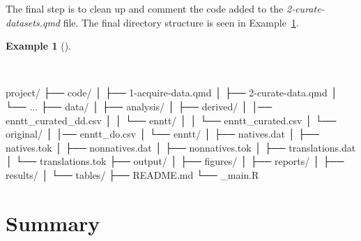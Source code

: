 \documentclass[
  letterpaper,
  DIV=11,
  numbers=noendperiod]{scrreport}
\newenvironment{Shaded}{\begin{snugshade}}{\end{snugshade}}
\newcommand{\ExtensionTok}[1]{\textcolor[rgb]{0.00,0.00,0.00}{#1}}
\newcommand{\NormalTok}[1]{\textcolor[rgb]{0.00,0.00,0.00}{#1}}
\theoremstyle{definition}
\newtheorem{example}{Example}[chapter]
\theoremstyle{remark}
\begin{document}
The final step is to clean up and comment the code added to the
\emph{2-curate-datasets.qmd} file. The final directory structure is seen
in Example~\ref{exm-cd-enntt-final-directory-structure}.

\begin{example}[]\protect\hypertarget{exm-cd-enntt-final-directory-structure}{}\label{exm-cd-enntt-final-directory-structure}

~

\begin{Shaded}
\begin{Highlighting}[]
\ExtensionTok{project/}
\ExtensionTok{├──}\NormalTok{ code/}
\ExtensionTok{│}\NormalTok{   ├── 1{-}acquire{-}data.qmd}
\ExtensionTok{│}\NormalTok{   ├── 2{-}curate{-}data.qmd}
\ExtensionTok{│}\NormalTok{   └── ...}
\ExtensionTok{├──}\NormalTok{ data/}
\ExtensionTok{│}\NormalTok{   ├── analysis/}
\ExtensionTok{│}\NormalTok{   ├── derived/}
\ExtensionTok{│}\NormalTok{       │── enntt\_curated\_dd.csv}
\ExtensionTok{│}\NormalTok{   │   └── enntt/}
\ExtensionTok{│}\NormalTok{   │       └── enntt\_curated.csv}
\ExtensionTok{│}\NormalTok{   └── original/}
\ExtensionTok{│}\NormalTok{       │── enntt\_do.csv}
\ExtensionTok{│}\NormalTok{       └── enntt/}
\ExtensionTok{│}\NormalTok{           ├── natives.dat}
\ExtensionTok{│}\NormalTok{           ├── natives.tok}
\ExtensionTok{│}\NormalTok{           ├── nonnatives.dat}
\ExtensionTok{│}\NormalTok{           ├── nonnatives.tok}
\ExtensionTok{│}\NormalTok{           ├── translations.dat}
\ExtensionTok{│}\NormalTok{           └── translations.tok}
\ExtensionTok{├──}\NormalTok{ output/}
\ExtensionTok{│}\NormalTok{   ├── figures/}
\ExtensionTok{│}\NormalTok{   ├── reports/}
\ExtensionTok{│}\NormalTok{   ├── results/}
\ExtensionTok{│}\NormalTok{   └── tables/}
\ExtensionTok{├──}\NormalTok{ README.md}
\ExtensionTok{└──}\NormalTok{ \_main.R}
\end{Highlighting}
\end{Shaded}

\end{example}

\hypertarget{summary-5}{%
\section*{Summary}\label{summary-5}}

\end{document}
